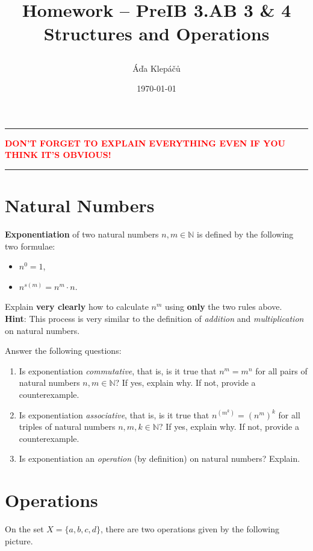 \documentclass[a4paper,11pt]{article}
\title{\Huge\textsf{Homework -- PreIB 3.AB 3 \& 4}\\
 \Large\textsf{Structures and Operations}
 \author{Áďa Klepáčů}
 \date{\today}
}
\newcommand{\N}{\mathbb{N}}
\newcommand{\clr}{\textcolor{red}}
\begin{document}
\maketitle
\thispagestyle{fancy}

\begin{center}
 \hrule
 \textbf{\clr{DON'T FORGET TO EXPLAIN EVERYTHING EVEN IF YOU THINK IT'S
 OBVIOUS!}}
 \vspace{2ex}
 \hrule
\end{center}
 
\section*{Natural Numbers}

\textbf{Exponentiation} of two natural numbers $n,m \in \N$ is defined by the
following two formulae:
\begin{itemize}
 \item $n^{0} = 1$,
 \item $n^{s(m)} = n^{m} \cdot n$.
\end{itemize}
Explain \textbf{very clearly} how to calculate $n^{m}$ using \textbf{only} the
two rules above.\\
\textbf{Hint}: This process is very similar to the definition of \emph{addition}
and \emph{multiplication} on natural numbers.

Answer the following questions:
\begin{enumerate}
 \item Is exponentiation \emph{commutative}, that is, is it true that $n^{m} =
  m^{n}$ for all pairs of natural numbers $n,m \in \N$? If yes, explain why. If
  not, provide a counterexample.
 \item Is exponentiation \emph{associative}, that is, is it true that
  $n^{(m^{k})} = (n^{m})^{k}$ for all triples of natural numbers $n,m,k \in \N$?
  If yes, explain why. If not, provide a counterexample.
 \item Is exponentiation an \emph{operation} (by definition) on natural numbers?
  Explain.
\end{enumerate}

\clearpage
\section*{Operations}

On the set $X = \{a,b,c,d\}$, there are two operations given by the following
picture.
\end{document}

